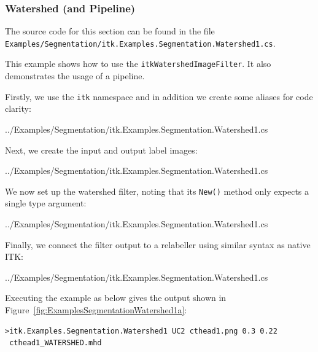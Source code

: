 \documentclass{InsightArticle}
\def\code#1{\texttt{#1}}
\begin{document}
\subsubsection{Watershed (and Pipeline)}
The source code for this section can be found in the file\\
\code{Examples/Segmentation/itk.Examples.Segmentation.Watershed1.cs}.

This example shows how to use the \code{itkWatershedImageFilter}.
It also demonstrates the usage of a pipeline.

Firstly, we use the \code{itk} namespace and in addition we create
some aliases for code clarity:
\begin{center}
	
	{../Examples/Segmentation/itk.Examples.Segmentation.Watershed1.cs}
\end{center}

Next, we create the input and output label images:
\begin{center}
	
	{../Examples/Segmentation/itk.Examples.Segmentation.Watershed1.cs}
\end{center}

We now set up the watershed filter, noting that its \code{New()} method
only expects a single type argument:
\begin{center}
	
	{../Examples/Segmentation/itk.Examples.Segmentation.Watershed1.cs}
\end{center}

Finally, we connect the filter output to a relabeller using similar
syntax as native ITK:
\begin{center}
	
	{../Examples/Segmentation/itk.Examples.Segmentation.Watershed1.cs}
\end{center}

Executing the example as below gives the output shown in Figure~\ref{fig:ExamplesSegmentationWatershed1a}:
\begin{lstlisting}
>itk.Examples.Segmentation.Watershed1 UC2 cthead1.png 0.3 0.22 
 cthead1_WATERSHED.mhd
\end{lstlisting}
\end{document}
